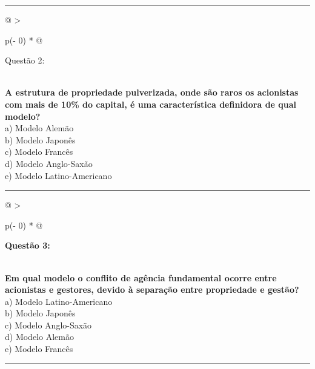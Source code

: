 \documentclass[
]{book}
\begin{document}
\begin{center}\rule{0.5\linewidth}{0.5pt}\end{center}

\begin{longtable}[]{@{}
  >{\raggedright\arraybackslash}p{(\columnwidth - 0\tabcolsep) * }@{}}
\toprule\noalign{}
\begin{minipage}[b]{\linewidth}\raggedright
Questão 2:
\end{minipage} \\
\midrule\noalign{}
\endhead
\bottomrule\noalign{}
\endlastfoot
\textbf{A estrutura de propriedade pulverizada, onde são raros os acionistas com mais de 10\% do capital, é uma característica definidora de qual modelo?} \\
a) Modelo Alemão \\
b) Modelo Japonês \\
c) Modelo Francês \\
d) Modelo Anglo-Saxão \\
e) Modelo Latino-Americano \\
\end{longtable}

\begin{center}\rule{0.5\linewidth}{0.5pt}\end{center}

\begin{longtable}[]{@{}
  >{\raggedright\arraybackslash}p{(\columnwidth - 0\tabcolsep) * }@{}}
\toprule\noalign{}
\begin{minipage}[b]{\linewidth}\raggedright
\textbf{Questão 3:}
\end{minipage} \\
\midrule\noalign{}
\endhead
\bottomrule\noalign{}
\endlastfoot
\textbf{Em qual modelo o conflito de agência fundamental ocorre entre acionistas e gestores, devido à separação entre propriedade e gestão?} \\
a) Modelo Latino-Americano \\
b) Modelo Japonês \\
c) Modelo Anglo-Saxão \\
d) Modelo Alemão \\
e) Modelo Francês \\
\end{longtable}

\begin{center}\rule{0.5\linewidth}{0.5pt}\end{center}
\end{document}
